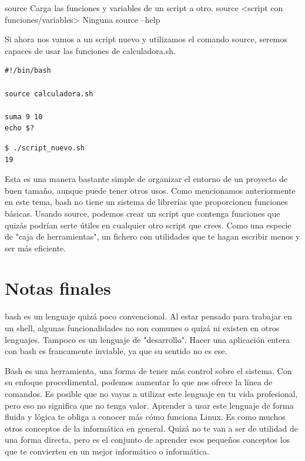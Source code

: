 \begin{command-info}
{source}
{Carga las funciones y variables de un script a otro.}
{source <script con funciones/variables>}
{Ninguna}
{source --help}
\end{command-info}

Si ahora nos vamos a un script nuevo y utilizamos el comando source, seremos capaces de usar las funciones de calculadora.sh.

\begin{tcolorbox-code}
\begin{lstlisting}
#!/bin/bash

source calculadora.sh

suma 9 10
echo $?
\end{lstlisting}
\end{tcolorbox-code}

\begin{tcolorbox-code}
\begin{lstlisting}
$ ./script_nuevo.sh
19
\end{lstlisting}
\end{tcolorbox-code}

Esta es una manera bastante simple de organizar el entorno de un proyecto de buen tamaño, aunque puede tener otros usos. Como mencionamos anteriormente en este tema, bash no tiene un sistema de librerías que proporcionen funciones básicas. Usando source, podemos crear un script que contenga funciones que quizás podrían serte útiles en cualquier otro script que crees. Como una especie de "caja de herramientas", un fichero con utilidades que te hagan escribir menos y ser más eficiente.

\section{Notas finales}
bash es un lenguaje quizá poco convencional. Al estar pensado para trabajar en un shell, algunas funcionalidades no son comunes o quizá ni existen en otros lenguajes. Tampoco es un lenguaje de "desarrollo". Hacer una aplicación entera con bash es francamente inviable, ya que su sentido no es ese. 

Bash es una herramienta, una forma de tener más control sobre el sistema. Con su enfoque procedimental, podemos aumentar lo que nos ofrece la línea de comandos. Es posible que no vayas a utilizar este lenguaje en tu vida profesional, pero eso no significa que no tenga valor. Aprender a usar este lenguaje de forma fluida y lógica te obliga a conocer más cómo funciona Linux. Es como muchos otros conceptos de la informática en general. Quizá no te van a ser de utilidad de una forma directa, pero es el conjunto de aprender esos pequeños conceptos los que te convierten en un mejor informático o informática. 

